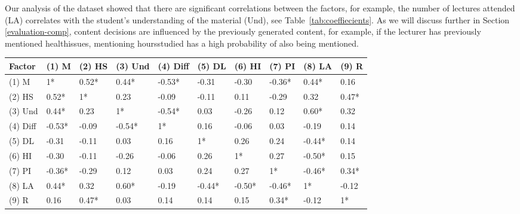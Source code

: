 \documentclass[11pt]{article}
\begin{document}
Our analysis of the dataset showed that there are significant correlations
between the factors, for example, the number of lectures
attended (LA) correlates with the student's understanding of the
material (Und), see Table~\ref{tab:coeffiecients}. 
As we will discuss further in Section \ref{evaluation-comp}, content decisions are influenced 
by the previously generated content, for example, if the lecturer
has previously mentioned health\textunderscore issues, mentioning hours\textunderscore studied has a high probability of also being mentioned. 



\begin{table*}[t]
\centering
\begin{tabular}{|l|l|l|l|l|l|l|l|l|l|}
 \hline
  Factor & (1) M & (2) HS & (3) Und & (4) Diff & (5) DL & (6) HI & (7) PI & (8) LA & (9) R \\
\hline \hline
(1) M  & 1* & 0.52* & 0.44* & -0.53* &  -0.31 & -0.30 & -0.36* & 0.44* & 0.16 \\
(2) HS  & 0.52* & 1* & 0.23 & -0.09 &  -0.11 & 0.11 & -0.29 & 0.32 & 0.47*\\
(3) Und & 0.44* & 0.23 & 1* & -0.54* &  0.03 & -0.26 &  0.12 & 0.60* & 0.32 \\
(4)	Diff & -0.53* & -0.09 & -0.54* & 1* & 0.16 & -0.06 & 0.03 & -0.19 & 0.14 \\
(5)	DL  & -0.31 & -0.11 & 0.03 & 0.16 & 1* & 0.26 & 0.24 & -0.44* & 0.14 \\
(6)	HI  & -0.30 & -0.11 & -0.26 & -0.06 & 0.26 & 1* & 0.27 & -0.50* & 0.15 \\
(7)	PI  & -0.36* & -0.29 & 0.12 & 0.03 &  0.24 & 0.27 & 1* & -0.46* & 0.34*\\
(8)	LA  & 0.44* & 0.32 & 0.60* & -0.19 &  -0.44* & -0.50* & -0.46* & 1* & -0.12 \\
(9)	R  & 0.16 & 0.47* & 0.03 & 0.14 & 0.14 & 0.15 & 0.34* & -0.12 & 1* \\
  \hline 
\end{tabular}
\footnotesize \caption {The table presents the Pearson's correlation coefficients of 
the factors (* means $p\textless 0.05$).}
\label{tab:coeffiecients}
\end{table*}
\end{document}
